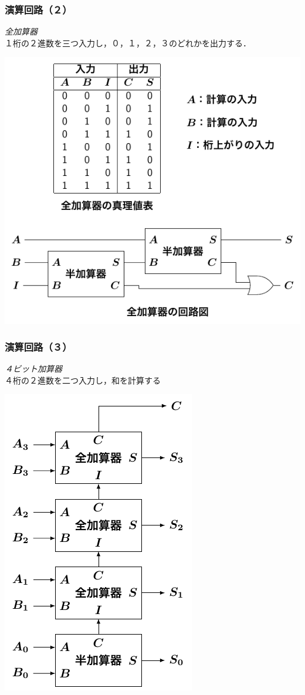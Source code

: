 \documentclass{beamer}                 %
\begin{document}
\begin{frame}
  \frametitle{演算回路（２）}
  \emph{全加算器} \\
  １桁の２進数を三つ入力し，０，１，２，３のどれかを出力する．
  \vfill
  \centerline{\includegraphics[scale=1.3]{../Tikz/fa.pdf}}
  \vfill
\end{frame}

\begin{frame}
  \frametitle{演算回路（３）}
  \emph{４ビット加算器} \\
  ４桁の２進数を二つ入力し，和を計算する
  \vfill
  \centerline{\includegraphics[scale=0.8]{../Tikz/adder.pdf}}
  \vfill
\end{frame}
\end{document}
